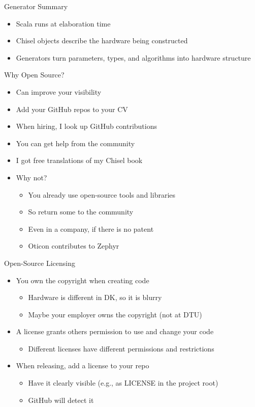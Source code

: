 \begin{frame}[fragile]{Generator Summary}
\begin{itemize}
\item Scala runs at elaboration time
\item Chisel objects describe the hardware being constructed
\item Generators turn parameters, types, and algorithms into hardware structure
\end{itemize}
\end{frame}

\begin{frame}[fragile]{Why Open Source?}
\begin{itemize}
\item Can improve your visibility
\item Add your GitHub repos to your CV
\item When hiring, I look up GitHub contributions
\item You can get help from the community
\item I got free translations of my Chisel book
\item Why not?
\begin{itemize}
\item You already use open-source tools and libraries
\item So return some to the community
\item Even in a company, if there is no patent
\item Oticon contributes to Zephyr
\end{itemize}
\end{itemize}
\end{frame}


\begin{frame}[fragile]{Open-Source Licensing}
\begin{itemize}
\item You own the copyright when creating code
\begin{itemize}
\item Hardware is different in DK, so it is blurry
\item Maybe your employer owns the copyright (not at DTU)
\end{itemize}
\item A license grants others permission to use and change your code
\begin{itemize}
\item Different licenses have different permissions and restrictions
\end{itemize}
\item When releasing, add a license to your repo
\begin{itemize}
\item Have it clearly visible (e.g., as LICENSE in the project root)
\item GitHub will detect it
\end{itemize}
\end{itemize}
\end{frame}


